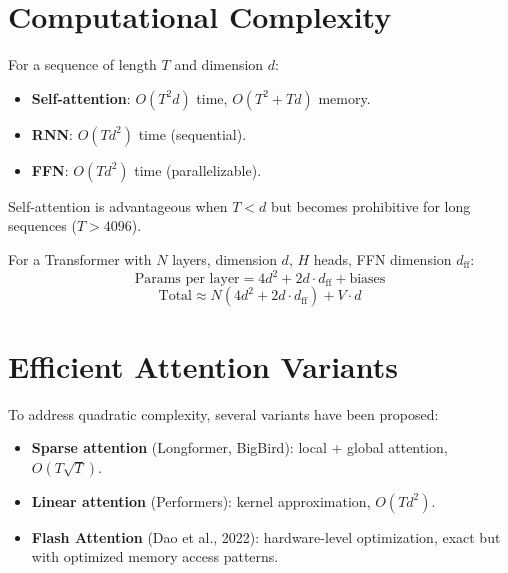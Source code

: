 \section{Computational Complexity}
\label{sec:att:complexity}

\begin{proposition}
For a sequence of length $T$ and dimension $d$:
\begin{itemize}
    \item \textbf{Self-attention}: $O(T^2 d)$ time, $O(T^2 + Td)$ memory.
    \item \textbf{RNN}: $O(T d^2)$ time (sequential).
    \item \textbf{FFN}: $O(T d^2)$ time (parallelizable).
\end{itemize}
Self-attention is advantageous when $T < d$ but becomes prohibitive for long
sequences ($T > 4096$).
\end{proposition}

\begin{keyformulas}[title=\textbf{Transformer parameter count}]
For a Transformer with $N$ layers, dimension $d$, $H$ heads, FFN dimension
$d_{\text{ff}}$:
\[
\text{Params per layer} = 4d^2 + 2d \cdot d_{\text{ff}} + \text{biases}
\]
\[
\text{Total} \approx N(4d^2 + 2d \cdot d_{\text{ff}}) + V \cdot d
\]
\end{keyformulas}

\section{Efficient Attention Variants}
\label{sec:att:efficient}

To address quadratic complexity, several variants have been proposed:

\begin{itemize}
    \item \textbf{Sparse attention} (Longformer, BigBird): local + global
          attention, $O(T \sqrt{T})$.
    \item \textbf{Linear attention} (Performers): kernel approximation,
          $O(Td^2)$.
    \item \textbf{Flash Attention} (Dao et al., 2022): hardware-level
          optimization, exact but with optimized memory access patterns.
\end{itemize}

